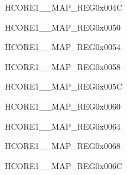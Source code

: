 \begin{register}{H}{CORE1\_\_MAP\_REG}{0x004C}\label{regdesc:CORE1LPSYSREGINTMAPREG}
\end{register}\vspace{-3em}


\begin{register}{H}{CORE1\_\_MAP\_REG}{0x0050}\label{regdesc:CORE1LPHUKINTMAPREG}
\end{register}\vspace{-3em}

\begin{register}{H}{CORE1\_\_MAP\_REG}{0x0054}\label{regdesc:CORE1SYSICMINTMAPREG}
\end{register}\vspace{-3em}


\begin{register}{H}{CORE1\_\_MAP\_REG}{0x0058}\label{regdesc:CORE1USBDEVICEINTMAPREG}
\end{register}\vspace{-3em}


\begin{register}{H}{CORE1\_\_MAP\_REG}{0x005C}\label{regdesc:CORE1SDIOHOSTINTMAPREG}
\end{register}\vspace{-3em}


\begin{register}{H}{CORE1\_\_MAP\_REG}{0x0060}\label{regdesc:CORE1AXIDMACINTMAPREG}
\end{register}\vspace{-3em}


\begin{register}{H}{CORE1\_\_MAP\_REG}{0x0064}\label{regdesc:CORE1SPI2INTMAPREG}
\end{register}\vspace{-3em}


\begin{register}{H}{CORE1\_\_MAP\_REG}{0x0068}\label{regdesc:CORE1SPI3INTMAPREG}
\end{register}\vspace{-3em}


\begin{register}{H}{CORE1\_\_MAP\_REG}{0x006C}\label{regdesc:CORE1I2S0INTMAPREG}
\end{register}\vspace{-3em}


